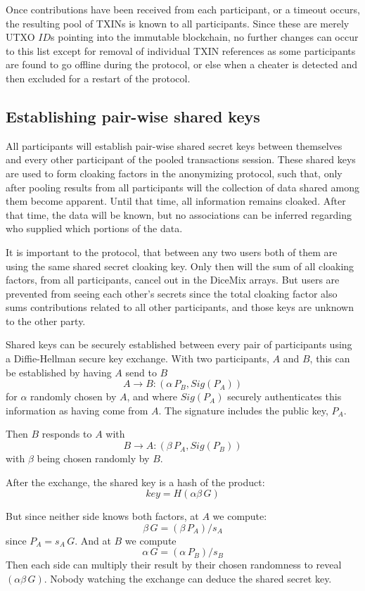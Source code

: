 \documentclass[8pt,fleqn,openany]{book}
\begin{document}
{Once contributions have been received from each participant, or a timeout occurs, the resulting pool of TXINs is known to all participants. Since these are merely UTXO $ID$s pointing into the immutable blockchain, no further changes can occur to this list except for removal of individual TXIN references as some participants are found to go offline during the protocol, or else when a cheater is detected and then excluded for a restart of the protocol.

\subsection{Establishing pair-wise shared keys} 
All participants will establish pair-wise shared secret keys between themselves and every other participant of the pooled transactions session. These shared keys are used to form cloaking factors in the anonymizing protocol, such that, only after pooling results from all participants will the collection of data shared among them become apparent. Until that time, all information remains cloaked. After that time, the data will be known, but no associations can be inferred regarding who supplied which portions of the data. 

It is important to the protocol, that between any two users both of them are using the same shared secret cloaking key. Only then will the sum of all cloaking factors, from all participants, cancel out in the DiceMix arrays. But users are prevented from seeing each other’s secrets since the total cloaking factor also sums contributions related to all other participants, and those keys are unknown to the other party.

Shared keys can be securely established between every pair of participants using a Diffie-Hellman secure key exchange\cite{c21}. With two participants, $A$ and $B$, this can be established by having $A$ send to $B$
$$A \rightarrow B: (\alpha \, P_B, Sig(P_A))$$
for $\alpha$ randomly chosen by $A$, and where $Sig(P_A)$ securely authenticates this information as having come from $A$. The signature includes the public key, $P_A$. 

Then $B$ responds to $A$ with
$$B \rightarrow A: (\beta \, P_A, Sig(P_B))$$
with $\beta$ being chosen randomly by $B$. 

After the exchange, the shared key is a hash of the product:
$$key = H(\alpha \beta \, G)$$ 

But since neither side knows both factors, at $A$ we compute:
$$\beta \, G = (\beta \, P_A) / s_A$$
since $P_A = s_A \, G$. And at $B$ we compute
$$\alpha \, G = (\alpha \, P_B) / s_B$$
Then each side can multiply their result by their chosen randomness to reveal $(\alpha \beta \, G)$. Nobody watching the exchange can deduce the shared secret key.

}
\end{document}
